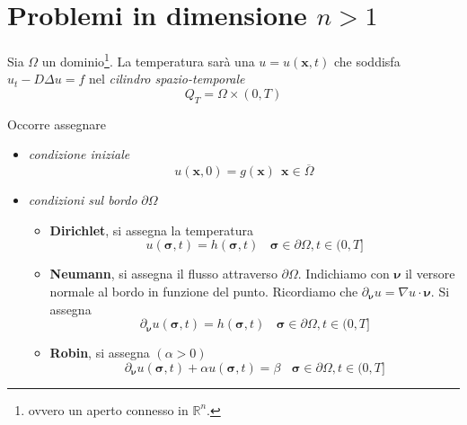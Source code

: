 \documentclass[10pt,a4paper,twoside,openright]{book}
\begin{document}

\section{Problemi in dimensione \texorpdfstring{$n>1$}{n > 1}}

Sia $\displaystyle \Omega $ un dominio\footnote{ovvero un aperto connesso in $\displaystyle \mathbb{R}^{n}$.}. La temperatura sarà una $u=u(\mathbf{x},t)$ che soddisfa $u_{t} -D\Delta u=f$ nel \textit{cilindro spazio-temporale}
\begin{equation*}
Q_{T} =\Omega \times (0,T)
\end{equation*}


Occorre assegnare
\begin{itemize}
\item \textit{condizione iniziale}\begin{equation*}
u(\mathbf{x},0) =g(\mathbf{x}) \ \ \mathbf{x} \in \overline{\Omega }
\end{equation*}
\item \textit{condizioni sul bordo} $\partial \Omega $
\begin{itemize}
\item \textbf{Dirichlet}, si assegna la temperatura\begin{equation*}
u(\mathbf{\sigma },t) =h(\mathbf{\sigma },t) \ \ \ \ \mathbf{\sigma } \in \partial \Omega,t\in ( 0,T]
\end{equation*}
\item \textbf{Neumann}, si assegna il flusso attraverso $\partial \Omega $. Indichiamo con $\bm{\nu}$ il versore normale al bordo in funzione del punto. Ricordiamo che $\partial _{\bm{\nu}} u=\nabla u\cdotp \bm{\nu}$. Si assegna\begin{equation}
\partial _{\bm{\nu}}u(\mathbf{\sigma },t) =h(\mathbf{\sigma },t) \ \ \ \ \mathbf{\sigma } \in \partial \Omega,t\in ( 0,T]
\end{equation}
\item \textbf{Robin}, si assegna $(\alpha  >0)$\begin{equation*}
\partial _{\bm{\nu}} u(\mathbf{\sigma },t) +\alpha u(\mathbf{\sigma },t) =\beta \ \ \ \ \mathbf{\sigma } \in \partial \Omega,t\in ( 0,T]
\end{equation*}
\end{itemize}
\end{itemize}
\end{document}
